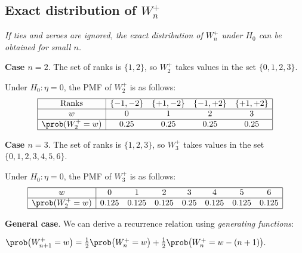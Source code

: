 \subsection{Exact distribution of $W^{+}_n$}
\bit
\it If ties and zeroes are ignored, the exact distribution of $W^{+}_n$ under $H_0$ can be obtained for small $n$.
\eit

\textbf{Case $n = 2$}. The set of ranks is $\{1,2\}$, so $W^{+}_2$ takes values in the set $\{0,1,2,3\}$. 

Under $H_0:\eta=0$, the  PMF of $W^{+}_2$ is as follows:
\[\begin{array}{|c|cccc|}\hline
\text{Ranks}			& \{-1,-2\}	& \{+1,-2\}	& \{-1,+2\}	& \{+1,+2\}	\\ \hline
w					& 0	& 1	& 2	& 3 \\ \hline
\prob(W^{+}_2=w)		& 0.25		& 0.25		&  0.25		& 0.25 		\\ \hline
\end{array}\]

\textbf{Case $n = 3$}. The set of ranks is $\{1,2,3\}$, so $W^{+}_3$ takes values in the set $\{0,1,2,3,4,5,6\}$. 


Under $H_0:\eta=0$, the  PMF of $W^{+}_3$ is as follows:
\[\begin{array}{|c|ccccccc|}\hline
w				& 0		& 1		& 2		& 3 		& 4 		& 5 		& 6		\\ \hline
\prob(W^{+}_2=w)	& 0.125	& 0.125	& 0.125	& 0.25	& 0.125	& 0.125	& 0.125	\\ \hline
\end{array}\]

\textbf{General case}. We can derive a recurrence relation using \emph{generating functions}:

\begin{theorem}
$
\prob\big(W^{+}_{n+1}=w\big) = \frac{1}{2}\prob\big(W^{+}_n=w\big) + \frac{1}{2}\prob\big(W^{+}_n=w-(n+1)\big).
$
\end{theorem}

